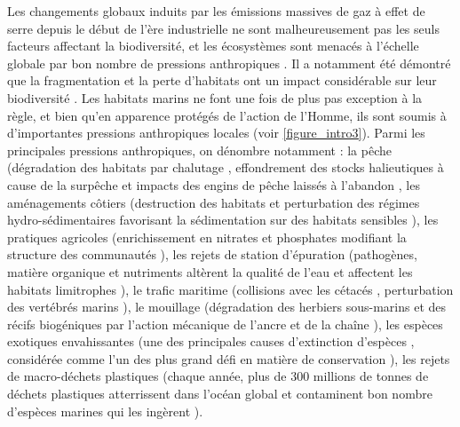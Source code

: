 Les changements globaux induits par les émissions massives de gaz à effet de serre depuis le début de l’ère industrielle ne sont malheureusement pas les seuls facteurs affectant la biodiversité, et les écosystèmes sont menacés à l’échelle globale par bon nombre de pressions anthropiques \citep{hoekstra_confronting_2004, halpern_global_2008}. Il a notamment été démontré que la fragmentation et la perte d’habitats ont un impact considérable sur leur biodiversité \citep{brooks_habitat_2002, haddad_habitat_2015}. Les habitats marins ne font une fois de plus pas exception à la règle, et bien qu’en apparence protégés de l’action de l’Homme, ils sont soumis à d’importantes pressions anthropiques locales \citep{micheli_cumulative_2013, halpern_spatial_2015, holon_predictive_2018} (voir \autoref{figure_intro3}). Parmi les principales pressions anthropiques, on dénombre notamment : la pêche (dégradation des habitats par chalutage \citep{hiddink_global_2017}, effondrement des stocks halieutiques à cause de la surpêche \citep{christensen_century_2014, essington_fishing_2015, link_global_2019} et impacts des engins de pêche laissés à l’abandon \citep{wilcox_understanding_2015, moschino_is_2019}, les aménagements côtiers (destruction des habitats et perturbation des régimes hydro-sédimentaires favorisant la sédimentation sur des habitats sensibles \citep{airoldi_effects_2003, holon_predictive_2018}), les pratiques agricoles (enrichissement en nitrates et phosphates modifiant la structure des communautés \citep{berger_effects_2003, savage_effects_2010}), les rejets de station d’épuration (pathogènes, matière organique et nutriments altèrent la qualité de l’eau et affectent les habitats limitrophes \citep{orth_global_2006, waycott_accelerating_2009}), le trafic maritime (collisions avec les cétacés \citep{peltier_monitoring_2019}, perturbation des vertébrés marins \citep{bruintjes_rapid_2016, simpson_anthropogenic_2016, bas_marine_2017,slabbekoorn_effects_2018}), le mouillage (dégradation des herbiers sous-marins \citep{short_natural_1996} et des récifs biogéniques \citep{ballesteros_mediterranean_2006} par l’action mécanique de l’ancre et de la chaîne \citep{milazzo_boat_2004}), les espèces exotiques envahissantes (une des principales causes d’extinction d’espèces \citep{bellard_alien_2016}, considérée comme l’un des plus grand défi en matière de conservation \citep{pysek_invasive_2010}), les rejets de macro-déchets plastiques (chaque année, plus de 300 millions de tonnes de déchets plastiques atterrissent dans l’océan global \citep{law_plastics_2017} et contaminent bon nombre d’espèces marines qui les ingèrent \citep{schuyler_global_2013, wilcox_threat_2015}).

